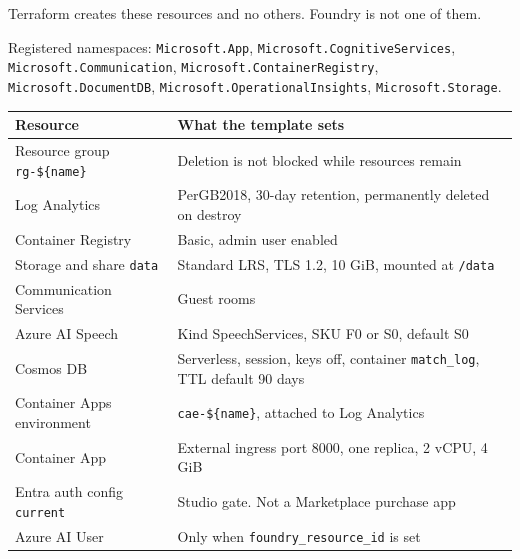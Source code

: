 \documentclass[11pt]{article}
\begin{document}
\begin{center}
\end{center}
{\small\color{Muted} Terraform creates these resources and no others. Foundry is not one of them.\par}
Registered namespaces: \texttt{Microsoft.App}, \texttt{Microsoft.CognitiveServices},
\texttt{Microsoft.Communication}, \texttt{Microsoft.ContainerRegistry},
\texttt{Microsoft.DocumentDB}, \texttt{Microsoft.OperationalInsights},
\texttt{Microsoft.Storage}.

\begin{tabularx}{\textwidth}{@{}lX@{}}
\toprule
Resource & What the template sets \\
\midrule
Resource group \texttt{rg-\$\{name\}} & Deletion is not blocked while resources remain \\
Log Analytics & PerGB2018, 30-day retention, permanently deleted on destroy \\
Container Registry & Basic, admin user enabled \\
Storage and share \texttt{data} & Standard LRS, TLS 1.2, 10 GiB, mounted at \texttt{/data} \\
Communication Services & Guest rooms \\
Azure AI Speech & Kind SpeechServices, SKU F0 or S0, default S0 \\
Cosmos DB & Serverless, session, keys off, container \texttt{match\_log}, TTL default 90 days \\
Container Apps environment & \texttt{cae-\$\{name\}}, attached to Log Analytics \\
Container App & External ingress port 8000, one replica, 2 vCPU, 4 GiB \\
Entra auth config \texttt{current} & Studio gate. Not a Marketplace purchase app \\
Azure AI User & Only when \texttt{foundry\_resource\_id} is set \\
\bottomrule
\end{tabularx}
\end{document}
